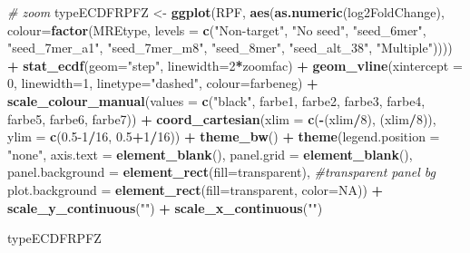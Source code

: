 \documentclass[
]{article}
\newenvironment{Shaded}{\begin{snugshade}}{\end{snugshade}}
\newcommand{\AttributeTok}[1]{\textcolor[rgb]{0.13,0.29,0.53}{#1}}
\newcommand{\CommentTok}[1]{\textcolor[rgb]{0.56,0.35,0.01}{\textit{#1}}}
\newcommand{\ConstantTok}[1]{\textcolor[rgb]{0.56,0.35,0.01}{#1}}
\newcommand{\DecValTok}[1]{\textcolor[rgb]{0.00,0.00,0.81}{#1}}
\newcommand{\FloatTok}[1]{\textcolor[rgb]{0.00,0.00,0.81}{#1}}
\newcommand{\FunctionTok}[1]{\textcolor[rgb]{0.13,0.29,0.53}{\textbf{#1}}}
\newcommand{\NormalTok}[1]{#1}
\newcommand{\OtherTok}[1]{\textcolor[rgb]{0.56,0.35,0.01}{#1}}
\newcommand{\SpecialCharTok}[1]{\textcolor[rgb]{0.81,0.36,0.00}{\textbf{#1}}}
\newcommand{\StringTok}[1]{\textcolor[rgb]{0.31,0.60,0.02}{#1}}
\begin{document}
\begin{Shaded}
\begin{Highlighting}[]
\CommentTok{\# zoom}
\NormalTok{typeECDFRPFZ }\OtherTok{\textless{}{-}} \FunctionTok{ggplot}\NormalTok{(RPF, }\FunctionTok{aes}\NormalTok{(}\FunctionTok{as.numeric}\NormalTok{(log2FoldChange), }
                              \AttributeTok{colour=}\FunctionTok{factor}\NormalTok{(MREtype, }\AttributeTok{levels =} \FunctionTok{c}\NormalTok{(}\StringTok{"Non{-}target"}\NormalTok{, }\StringTok{"No seed"}\NormalTok{, }\StringTok{"seed\_6mer"}\NormalTok{, }\StringTok{"seed\_7mer\_a1"}\NormalTok{, }\StringTok{"seed\_7mer\_m8"}\NormalTok{, }\StringTok{"seed\_8mer"}\NormalTok{, }\StringTok{"seed\_alt\_38"}\NormalTok{, }\StringTok{"Multiple"}\NormalTok{)))) }\SpecialCharTok{+} 
  \FunctionTok{stat\_ecdf}\NormalTok{(}\AttributeTok{geom=}\StringTok{"step"}\NormalTok{, }\AttributeTok{linewidth=}\DecValTok{2}\SpecialCharTok{*}\NormalTok{zoomfac) }\SpecialCharTok{+}
  \FunctionTok{geom\_vline}\NormalTok{(}\AttributeTok{xintercept =} \DecValTok{0}\NormalTok{, }\AttributeTok{linewidth=}\DecValTok{1}\NormalTok{, }\AttributeTok{linetype=}\StringTok{"dashed"}\NormalTok{, }\AttributeTok{colour=}\NormalTok{farbeneg) }\SpecialCharTok{+}
  \FunctionTok{scale\_colour\_manual}\NormalTok{(}\AttributeTok{values =} \FunctionTok{c}\NormalTok{(}\StringTok{"black"}\NormalTok{, farbe1, farbe2, farbe3, farbe4, farbe5, farbe6, farbe7)) }\SpecialCharTok{+}
  \FunctionTok{coord\_cartesian}\NormalTok{(}\AttributeTok{xlim =} \FunctionTok{c}\NormalTok{(}\SpecialCharTok{{-}}\NormalTok{(xlim}\SpecialCharTok{/}\DecValTok{8}\NormalTok{), (xlim}\SpecialCharTok{/}\DecValTok{8}\NormalTok{)), }\AttributeTok{ylim =} \FunctionTok{c}\NormalTok{(}\FloatTok{0.5}\DecValTok{{-}1}\SpecialCharTok{/}\DecValTok{16}\NormalTok{, }\FloatTok{0.5}\SpecialCharTok{+}\DecValTok{1}\SpecialCharTok{/}\DecValTok{16}\NormalTok{)) }\SpecialCharTok{+} 
  \FunctionTok{theme\_bw}\NormalTok{() }\SpecialCharTok{+}
  \FunctionTok{theme}\NormalTok{(}\AttributeTok{legend.position =} \StringTok{"none"}\NormalTok{, }\AttributeTok{axis.text =} \FunctionTok{element\_blank}\NormalTok{(), }\AttributeTok{panel.grid =} \FunctionTok{element\_blank}\NormalTok{(),}
        \AttributeTok{panel.background =} \FunctionTok{element\_rect}\NormalTok{(}\AttributeTok{fill=}\StringTok{\textquotesingle{}transparent\textquotesingle{}}\NormalTok{), }\CommentTok{\#transparent panel bg}
        \AttributeTok{plot.background =} \FunctionTok{element\_rect}\NormalTok{(}\AttributeTok{fill=}\StringTok{\textquotesingle{}transparent\textquotesingle{}}\NormalTok{, }\AttributeTok{color=}\ConstantTok{NA}\NormalTok{)) }\SpecialCharTok{+}
  \FunctionTok{scale\_y\_continuous}\NormalTok{(}\StringTok{""}\NormalTok{) }\SpecialCharTok{+} \FunctionTok{scale\_x\_continuous}\NormalTok{(}\StringTok{""}\NormalTok{)}

\NormalTok{typeECDFRPFZ}
\end{Highlighting}
\end{Shaded}
\end{document}

